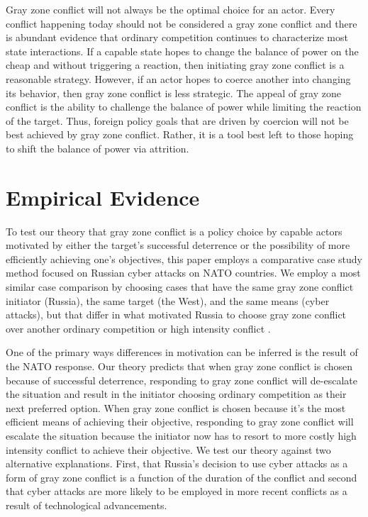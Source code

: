 \documentclass[12pt,letterpaper]{article}
\begin{document}
			Gray zone conflict will not always be the optimal choice for an actor. Every conflict happening today should not be considered a gray zone conflict and there is abundant evidence that ordinary competition continues to characterize most state interactions. If a capable state hopes to change the balance of power on the cheap and without triggering a reaction, then initiating gray zone conflict is a reasonable strategy. However, if an actor hopes to coerce another into changing its behavior, then gray zone conflict is less strategic. The appeal of gray zone conflict is the ability to challenge the balance of power while limiting the reaction of the target. Thus, foreign policy goals that are driven by coercion will not be best achieved by gray zone conflict. Rather, it is a tool best left to those hoping to shift the balance of power via attrition.

\section{Empirical Evidence}
	To test our theory that gray zone conflict is a policy choice by capable actors motivated by either the target's successful deterrence or the possibility of more efficiently achieving one's objectives, this paper employs a comparative case study method focused on Russian cyber attacks on NATO countries. We employ a most similar case comparison by choosing cases that have the same gray zone conflict initiator (Russia), the same target (the West), and the same means (cyber attacks), but that differ in what motivated Russia to choose gray zone conflict over another ordinary competition or high intensity conflict \citep{bennett_casestudymethods_2007}.
		
	One of the primary ways differences in motivation can be inferred is the result of the NATO response. Our theory predicts that when gray zone conflict is chosen because of successful deterrence, responding to gray zone conflict will de-escalate the situation and result in the initiator choosing ordinary competition as their next preferred option. When gray zone conflict is chosen because it's the most efficient means of achieving their objective, responding to gray zone conflict will escalate the situation because the initiator now has to resort to more costly high intensity conflict to achieve their objective. We test our theory against two alternative explanations. First, that Russia's decision to use cyber attacks as a form of gray zone conflict is a function of the duration of the conflict and second that cyber attacks are more likely to be employed in more recent conflicts as a result of technological advancements.
\end{document}
